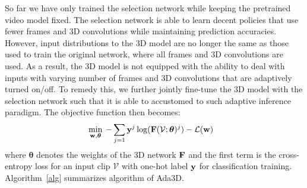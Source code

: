 \documentclass[final]{cvpr}
\newcommand{\system}{{Ada3D}\xspace}
\begin{document}
So far we have only trained the selection network while keeping the pretrained video model fixed. The selection network is able to learn decent policies that use fewer frames and 3D convolutions while maintaining prediction accuracies. However, input distributions to the 3D model are no longer the same as those used to train the original network, where all frames and 3D convolutions are used. As a result, the 3D model is not equipped with the ability to deal with inputs with varying number of frames and 3D convolutions that are adaptively turned on/off. To remedy this, we further jointly fine-tune the 3D model with the selection network such that it is able to accustomed to such adaptive inference paradigm. The objective function then becomes:
\begin{align}
& \min_{\bf w, \bm \theta} \: -\sum_{j=1}{{\bf y}^j \log({\bf F}(\mathcal{V}; {\bm \theta})^j)} - \mathcal{L}({\bf w})
\label{eqn:jointft}
\end{align}
where $\bm \theta$ denotes the weights of the 3D network $\bf F$ and the first term is the cross-entropy loss for an input clip $\mathcal{V}$ with one-hot label $\bf y$ for classification training. 
Algorithm~\ref{alg} summarizes algorithm of \system.
\end{document}
